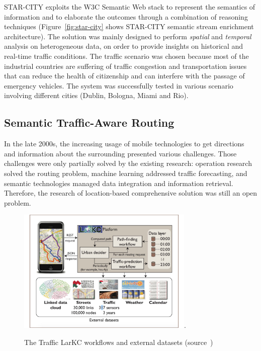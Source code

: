 STAR-CITY exploits the W3C Semantic Web stack to represent the semantics of information and to elaborate the outcomes through a combination of reasoning techniques (Figure~\ref{fig:star-city} shows STAR-CITY semantic stream enrichment architecture). The solution was mainly designed to perform \textit{spatial} and \textit{temporal} analysis on heterogeneous data, on order to provide insights on historical and real-time traffic conditions.
The traffic scenario was chosen because most of the industrial countries are suffering of traffic congestion and transportation issues that can reduce the health of citizenship and can interfere with the passage of emergency vehicles.
The system was successfully tested in various scenario involving different cities (Dublin, Bologna, Miami and Rio).

\subsection{Semantic Traffic-Aware Routing} \label{sec:uda-trafficlark}
In the late 2000s, the increasing usage of mobile technologies to get directions and information about the surrounding presented various challenges. Those challenges were only partially solved by the existing research: operation research solved the routing problem, machine learning addressed traffic forecasting, and semantic technologies managed data integration and information retrieval. Therefore, the research of location-based comprehensive solution was still an open problem.

\begin{figure}[t]
	\centering
	\includegraphics[width=0.75\textwidth]{img/traffic-lark.pdf}.
    \caption{The Traffic LarKC workflows and external datasets (source~\cite{DBLP:journals/internet/ValleCDGST11})}
    \label{fig:traffic-lark}
\end{figure}


